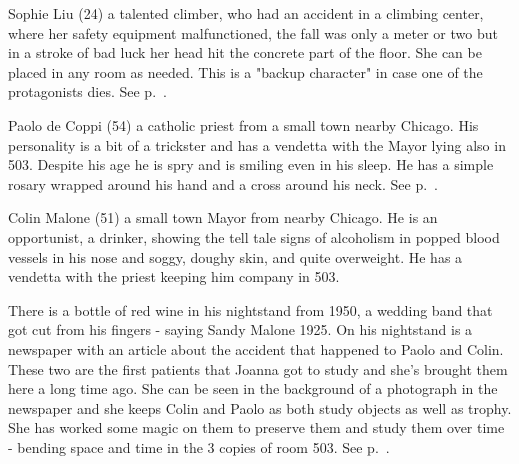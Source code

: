 \begin{description}
  \item{Sophie Liu} (24) a talented climber, who had an accident in a climbing center, where her safety equipment malfunctioned,
    the fall was only a meter or two but in a stroke of bad luck her head hit the concrete part of the floor. She can be placed in
    any room as needed. This is a "backup character" in case one of the protagonists dies.
    See p.~\pageref{ssub:other_patient_rooms}.

  \item{Paolo de Coppi} (54) a catholic priest from a small town nearby Chicago. His personality is a bit of a trickster and has a
    vendetta with the Mayor lying also in 503. Despite his age he is spry and is smiling even in his sleep. He has a simple rosary
    wrapped around his hand and a cross around his neck.
    See p.~\pageref{ssub:other_patient_rooms_503}.
  
  \item{Colin Malone} (51) a small town Mayor from nearby Chicago. He is an opportunist, a drinker, showing the tell tale signs of
    alcoholism in popped blood vessels in his nose and soggy, doughy skin, and quite overweight. He has a vendetta with the
    priest keeping him company in 503.

    There is a bottle of red wine in his nightstand from 1950, a wedding band that got cut from his fingers - saying Sandy Malone
    1925. On his nightstand is a newspaper with an article about the accident that happened to Paolo and Colin. These two are the
    first patients that Joanna got to study and she's brought them here a long time ago. She can be seen in the background of a
    photograph in the newspaper and she keeps Colin and Paolo as both study objects as well as trophy. She has worked some magic
    on them to preserve them and study them over time - bending space and time in the 3 copies of room 503.
    See p.~\pageref{ssub:other_patient_rooms_503}.
\end{description}

\clearpage %
